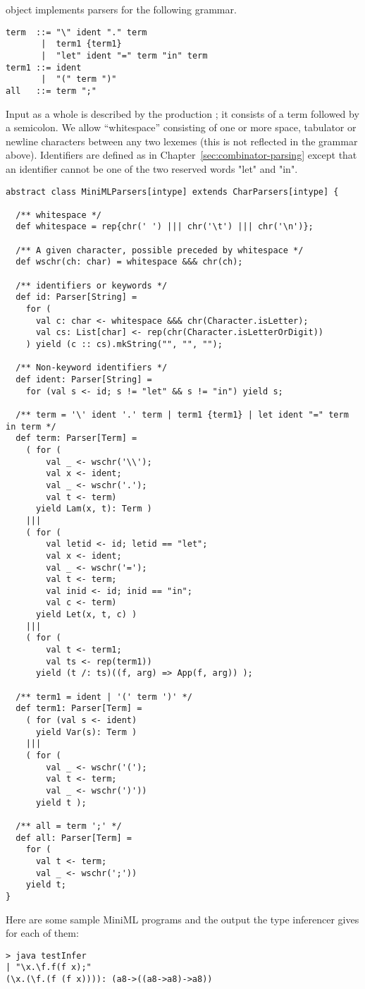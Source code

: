 {object implements parsers for the following grammar.
\begin{lstlisting}
term  ::= "\" ident "." term
       |  term1 {term1}
       |  "let" ident "=" term "in" term
term1 ::= ident
       |  "(" term ")"
all   ::= term ";"
\end{lstlisting}
Input as a whole is described by the production ; it
consists of a term followed by a semicolon. We allow ``whitespace''
consisting of one or more space, tabulator or newline characters
between any two lexemes (this is not reflected in the grammar
above). Identifiers are defined as in
Chapter~\ref{sec:combinator-parsing} except that an identifier cannot
be one of the two reserved words "let" and "in".
\begin{lstlisting}
abstract class MiniMLParsers[intype] extends CharParsers[intype] {

  /** whitespace */
  def whitespace = rep{chr(' ') ||| chr('\t') ||| chr('\n')};

  /** A given character, possible preceded by whitespace */
  def wschr(ch: char) = whitespace &&& chr(ch);

  /** identifiers or keywords */
  def id: Parser[String] = 
    for (
      val c: char <- whitespace &&& chr(Character.isLetter); 
      val cs: List[char] <- rep(chr(Character.isLetterOrDigit))
    ) yield (c :: cs).mkString("", "", "");

  /** Non-keyword identifiers */
  def ident: Parser[String] =
    for (val s <- id; s != "let" && s != "in") yield s;

  /** term = '\' ident '.' term | term1 {term1} | let ident "=" term in term */
  def term: Parser[Term] =
    ( for (
        val _ <- wschr('\\');
        val x <- ident;
        val _ <- wschr('.');
        val t <- term)
      yield Lam(x, t): Term )
    |||
    ( for (
        val letid <- id; letid == "let"; 
        val x <- ident; 
        val _ <- wschr('='); 
        val t <- term; 
        val inid <- id; inid == "in"; 
        val c <- term)
      yield Let(x, t, c) )
    |||
    ( for (
        val t <- term1;
        val ts <- rep(term1))
      yield (t /: ts)((f, arg) => App(f, arg)) );

  /** term1 = ident | '(' term ')' */
  def term1: Parser[Term] = 
    ( for (val s <- ident)
      yield Var(s): Term )
    |||
    ( for (
        val _ <- wschr('(');
        val t <- term;
        val _ <- wschr(')'))
      yield t );

  /** all = term ';' */
  def all: Parser[Term] = 
    for (
      val t <- term;
      val _ <- wschr(';'))
    yield t;
}
\end{lstlisting}
Here are some sample MiniML programs and the output the type inferencer gives for each of them:
\begin{lstlisting}
> java testInfer
| "\x.\f.f(f x);"
(\x.(\f.(f (f x)))): (a8->((a8->a8)->a8))


\end{lstlisting}}
